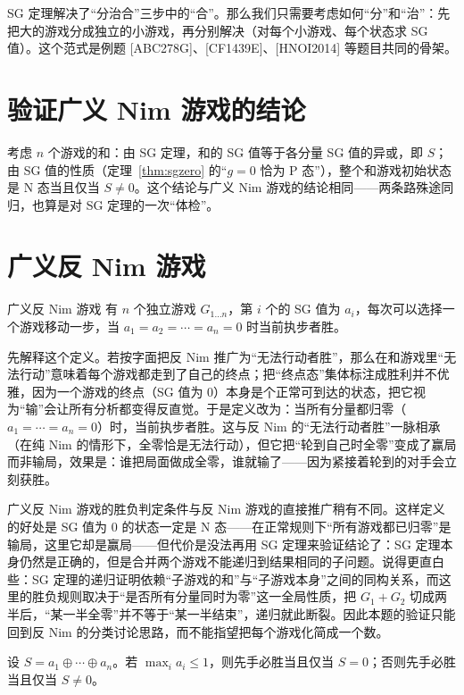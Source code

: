 SG 定理解决了“分治合”三步中的“合”。那么我们只需要考虑如何“分”和“治”：先把大的游戏分成独立的小游戏，再分别解决（对每个小游戏、每个状态求 SG 值）。这个范式是例题 [ABC278G]、[CF1439E]、[HNOI2014] 等题目共同的骨架。

\section{验证广义 Nim 游戏的结论}
考虑 $n$ 个游戏的和：由 SG 定理，和的 SG 值等于各分量 SG 值的异或，即 $S$；由 SG 值的性质（定理~\ref{thm:sgzero} 的“$g=0$ 恰为 P 态”），整个和游戏初始状态是 N 态当且仅当 $S\ne0$。这个结论与广义 Nim 游戏的结论相同——两条路殊途同归，也算是对 SG 定理的一次“体检”。

\section{广义反 Nim 游戏}
\begin{problem}{广义反 Nim 游戏}
有 $n$ 个独立游戏 $G_{1\ldots n}$，第 $i$ 个的 SG 值为 $a_i$，每次可以选择一个游戏移动一步，当 $a_1=a_2=\cdots=a_n=0$ 时当前执步者胜。
\end{problem}

先解释这个定义。若按字面把反 Nim 推广为“无法行动者胜”，那么在和游戏里“无法行动”意味着每个游戏都走到了自己的终点；把“终点态”集体标注成胜利并不优雅，因为一个游戏的终点（SG 值为 $0$）本身是个正常可到达的状态，把它视为“输”会让所有分析都变得反直觉。于是定义改为：当所有分量都归零（$a_1=\cdots=a_n=0$）时，当前执步者胜。这与反 Nim 的“无法行动者胜”一脉相承（在纯 Nim 的情形下，全零恰是无法行动），但它把“轮到自己时全零”变成了赢局而非输局，效果是：谁把局面做成全零，谁就输了——因为紧接着轮到的对手会立刻获胜。

广义反 Nim 游戏的胜负判定条件与反 Nim 游戏的直接推广稍有不同。这样定义的好处是 SG 值为 $0$ 的状态一定是 N 态——在正常规则下“所有游戏都已归零”是输局，这里它却是赢局——但代价是没法再用 SG 定理来验证结论了：SG 定理本身仍然是正确的，但是合并两个游戏不能递归到结果相同的子问题。说得更直白些：SG 定理的递归证明依赖“子游戏的和”与“子游戏本身”之间的同构关系，而这里的胜负规则取决于“是否所有分量同时为零”这一全局性质，把 $G_1+G_2$ 切成两半后，“某一半全零”并不等于“某一半结束”，递归就此断裂。因此本题的验证只能回到反 Nim 的分类讨论思路，而不能指望把每个游戏化简成一个数。

\begin{corollary}
设 $S=a_1\oplus\cdots\oplus a_n$。若 $\max_i a_i\le1$，则先手必胜当且仅当 $S=0$；否则先手必胜当且仅当 $S\ne0$。
\end{corollary}

